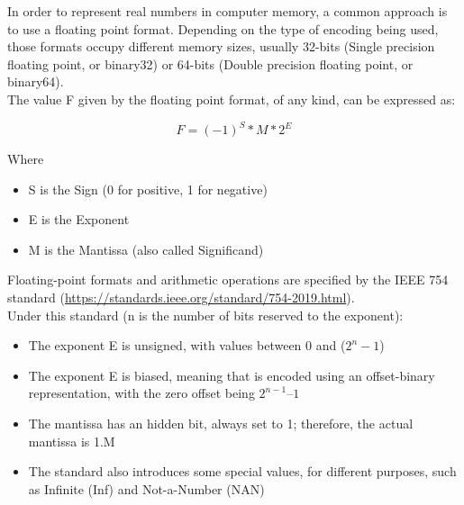 In order to represent real numbers in computer memory, a common approach is to use a floating point format. Depending on the type of encoding being used, those formats occupy different memory sizes, usually 32-bits (Single precision floating point, or binary32) or 64-bits (Double precision floating point, or binary64). \\
The value F given by the floating point format, of any kind, can be expressed as:

$$F = (-1)^{S}*M*2^{E} $$

Where 
\begin{itemize}
	\item S is the Sign (0 for positive, 1 for negative)
	\item E is the Exponent
	\item M is the Mantissa (also called Significand)
\end{itemize}

Floating-point formats and arithmetic operations are specified by the IEEE 754 standard (\url{https://standards.ieee.org/standard/754-2019.html}). \\
Under this standard (n is the number of bits reserved to the exponent):
\begin{itemize}
	\item The exponent E is unsigned, with values between 0 and ($2^{n} -1$)
	\item	The exponent E is biased, meaning that is encoded using an offset-binary representation, with the zero offset being 			$2^{n-1} – 1$
	\item	The mantissa has an hidden bit, always set to 1; therefore, the actual mantissa is 1.M
	\item	The standard also introduces some special values, for different purposes, such as Infinite (Inf) and Not-a-Number (NAN)
\end{itemize}

